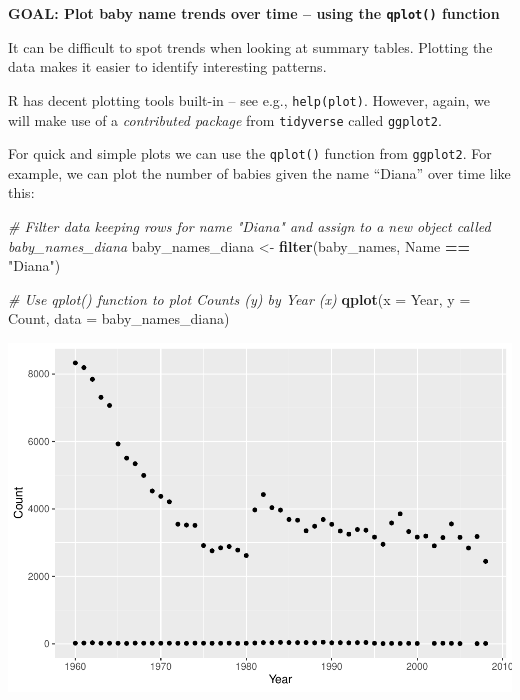 \documentclass[
]{book}
\newenvironment{Shaded}{\begin{snugshade}}{\end{snugshade}}
\newcommand{\CommentTok}[1]{\textcolor[rgb]{0.56,0.35,0.01}{\textit{#1}}}
\newcommand{\DataTypeTok}[1]{\textcolor[rgb]{0.13,0.29,0.53}{#1}}
\newcommand{\KeywordTok}[1]{\textcolor[rgb]{0.13,0.29,0.53}{\textbf{#1}}}
\newcommand{\NormalTok}[1]{#1}
\newcommand{\OperatorTok}[1]{\textcolor[rgb]{0.81,0.36,0.00}{\textbf{#1}}}
\newcommand{\StringTok}[1]{\textcolor[rgb]{0.31,0.60,0.02}{#1}}
\begin{document}
\textbf{GOAL: Plot baby name trends over time -- using the \texttt{qplot()} function}

It can be difficult to spot trends when looking at summary tables. Plotting the data makes it easier to identify interesting patterns.

R has decent plotting tools built-in -- see e.g., \texttt{help(plot)}. However, again, we will make use of a \emph{contributed package} from \texttt{tidyverse} called \texttt{ggplot2}.

For quick and simple plots we can use the \texttt{qplot()} function from \texttt{ggplot2}. For example, we can plot the number of babies given the name ``Diana'' over time like this:

\begin{Shaded}
\begin{Highlighting}[]
\CommentTok{\# Filter data keeping rows for name "Diana" and assign to a new object called baby\_names\_diana}
\NormalTok{baby\_names\_diana \textless{}{-}}\StringTok{ }\KeywordTok{filter}\NormalTok{(baby\_names, Name }\OperatorTok{==}\StringTok{ "Diana"}\NormalTok{)}
\end{Highlighting}
\end{Shaded}

\begin{Shaded}
\begin{Highlighting}[]
\CommentTok{\# Use qplot() function to plot Counts (y) by Year (x)}
\KeywordTok{qplot}\NormalTok{(}\DataTypeTok{x =}\NormalTok{ Year, }\DataTypeTok{y =}\NormalTok{ Count,}
     \DataTypeTok{data =}\NormalTok{ baby\_names\_diana)}
\end{Highlighting}
\end{Shaded}

\includegraphics{R/Rintro/figures/unnamed-chunk-42-1.pdf}
\end{document}
